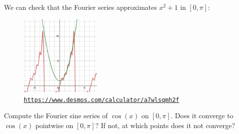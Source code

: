 \documentclass[plain]{pset}
\begin{document}
\begin{solution}
    We can check that the Fourier series approximates \(x^2 + 1\) in \([0, \pi]\):
    \begin{figure}[h!]
        \centering
        \includegraphics[width=0.35\textwidth]{1.png}
        \caption{\href{https://www.desmos.com/calculator/a7wlsqmh2f}{\texttt{https://www.desmos.com/calculator/a7wlsqmh2f}}}
    \end{figure}
\end{solution}

\pagebreak

\begin{problem}
Compute the Fourier sine series of \(\cos(x)\) on \([0, \pi]\). Does it converge to \(\cos(x)\) pointwise on \([0, \pi]\)? If not, at which points does it not converge?
\end{problem}
\end{document}
